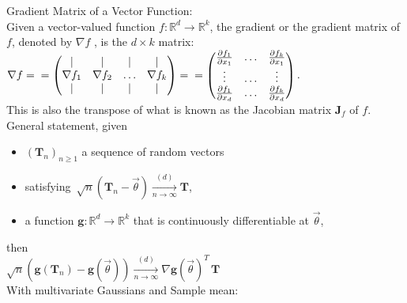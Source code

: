 Gradient Matrix of a Vector Function:\\

Given a vector-valued function $f:\mathbb {R}^ d \to \mathbb {R}^ k$, the gradient or the gradient matrix of $f$, denoted by $\nabla f$ , is the $d \times k$ matrix:\\

$   \nabla f =\\ = \begin{pmatrix} |& |& |& |\\ \nabla f_1&  \nabla f_2& \ldots & \nabla f_ k\\ |& |& |& |\\ \end{pmatrix} = \\
= \begin{pmatrix} \frac{\partial f_1}{\partial x_1}& \ldots & \frac{\partial f_ k}{\partial x_1}\\ \vdots & \ldots & \vdots \\ \frac{\partial f_1}{\partial x_ d}& \ldots & \frac{\partial f_ k}{\partial x_ d} \end{pmatrix}.$\\

This is also the transpose of what is known as the Jacobian matrix $\mathbf{J}_ f$ of $f$.\\

General statement, given\\

\begin{itemize}
	\item $\left(\mathbf{T}_ n\right)_{n\geq 1}$ a sequence of random vectors 
	\item satisfying $\,  \sqrt{n} \left(\mathbf{T}_ n - \vec{\theta } \right) \xrightarrow [n\to \infty ]{(d)} \mathbf{T}$,

	\item a function $\mathbf{g}:\mathbb {R}^ d\to \mathbb {R}^ k$  that is continuously differentiable at $\vec{\theta }$,

\end{itemize}

then\\

$   \sqrt{n} \left(\mathbf{g}(\mathbf{T}_ n) - \mathbf{g}(\vec{\theta }) \right) \xrightarrow [n\to \infty ]{(d)} \nabla \mathbf{g}(\vec{\theta })^ T\, \mathbf{T}\qquad$\\

With multivariate Gaussians and Sample mean:\\

